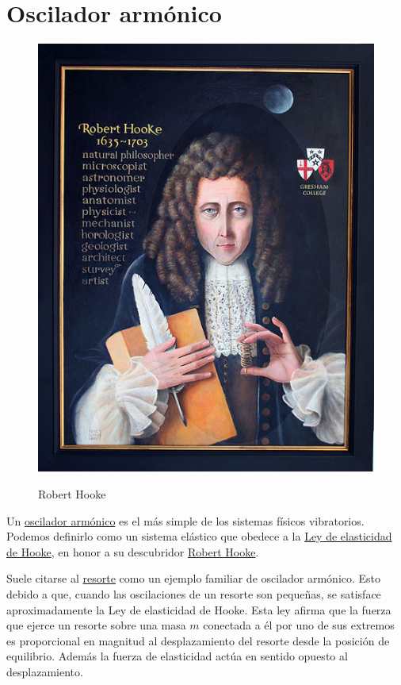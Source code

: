 \documentclass{article}
\newcounter{ejemplo_cont}
\begin{document}
\section{Oscilador armónico}\label{resortito}



\begin{figure}
\begin{center}
\includegraphics[scale=.15]{imagenes/Hooke.JPG}\\
\caption{Robert Hooke}
\end{center}
\end{figure}
Un \href{http://es.wikipedia.org/wiki/Oscilador_armónico}{oscilador armónico} es el más simple de los sistemas físicos vibratorios. Podemos definirlo como un sistema
elástico que obedece a la \href{http://es.wikipedia.org/wiki/Ley_de_Hooke}{Ley de elasticidad de Hooke}, en honor a su descubridor 
\href{http://es.wikipedia.org/wiki/Robert_Hooke}{Robert Hooke}.

Suele citarse al \href{http://es.wikipedia.org/wiki/Resorte}{resorte} como un ejemplo familiar de oscilador armónico. Esto debido a que, cuando las oscilaciones de un resorte son
pequeñas,  se satisface aproximadamente la Ley de elasticidad de  Hooke. Esta ley  afirma que la fuerza que ejerce un resorte sobre una masa $m$ conectada a él por uno
de sus extremos es proporcional en magnitud al desplazamiento
del resorte desde la posición de equilibrio. Además la fuerza de elasticidad actúa en sentido opuesto al desplazamiento.
\end{document}
